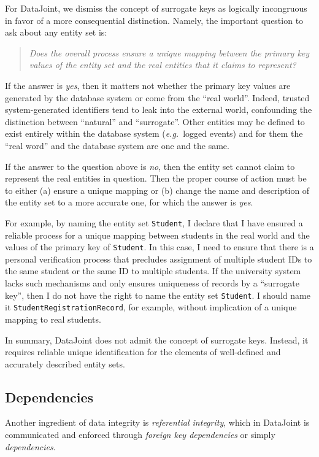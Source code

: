 \documentclass[letter,10pt]{article}
\newcommand{\datajoint}{DataJoint\xspace}
\begin{document}
For \datajoint, we dismiss the concept of surrogate keys as logically incongruous in favor of a more consequential distinction.
Namely, the important question to ask about any entity set is:
\begin{quote}
\em
Does the overall process ensure a unique mapping between the primary key values of the entity set and the real entities that it claims to represent?
\end{quote}

If the answer is \emph{yes}, then it matters not whether the primary key values are generated by the database system or come from the ``real world''. 
Indeed, trusted system-generated identifiers tend to leak into the external world, confounding the distinction between ``natural'' and ``surrogate''.
Other entities may be defined to exist entirely within the database system (\emph{e.g.}\ logged events) and for them the ``real word'' and the database system are one and the same.

If the answer to the question above is \emph{no}, then the entity set cannot claim to represent the real entities in question. 
Then the proper course of action must  be to either (a) ensure a unique mapping or (b) change the name and description of the entity set to a more accurate one, for which the answer is \emph{yes}. 

For example, by naming the entity set \lstinline$Student$, I declare that I have ensured a reliable process for a unique mapping between students in the real world and the values of the primary key of \lstinline$Student$.
In this case, I need to ensure that there is a personal verification process that precludes assignment of multiple student IDs to the same student or the same ID to multiple students.
If the university system lacks such mechanisms and only ensures uniqueness of records by a ``surrogate key'', then I do not have the right to name the entity set \lstinline$Student$.
I should name it \lstinline$StudentRegistrationRecord$, for example, without implication of a unique mapping to real students.

In summary, \datajoint does not admit the concept of surrogate keys.  
Instead, it requires reliable unique identification for the elements of well-defined and accurately described entity sets.

\subsection{Dependencies}
Another ingredient of data integrity is \emph{referential integrity}, which in \datajoint is communicated and enforced through \emph{foreign key dependencies} or simply \emph{dependencies}.
\end{document}
